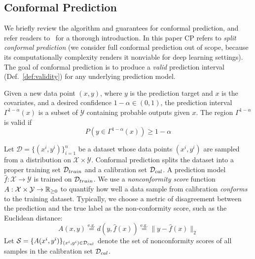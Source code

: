 

\subsection{Conformal Prediction}

We briefly review the algorithm and guarantees for conformal prediction, and refer readers to~\cite{angelopoulos2021gentle} for a thorough introduction. In this paper CP refers to \textit{split conformal prediction} (we consider full conformal prediction out of scope, because its computationally complexity renders it nonviable for deep learning settings). The goal of conformal prediction is to produce a \textit{valid} prediction interval (Def.~\ref{def:validity}) for any underlying prediction model.
%
\begin{definition}[Validity]
Given a new data point $(x,y)$, where $y$ is the prediction target and $x$ is the covariates,  and a desired confidence $1-\alpha \in (0,1)$, the prediction interval $\Gamma^{1-\alpha}(x)$ is a subset of $\mathcal{Y}$ containing probable outputs given $x$. The region $\Gamma^{1-\alpha}$ is valid if
%
\begin{equation}\label{eq:coverage}
P (y \in \Gamma^{1-\alpha}(x)) \geq 1-\alpha
 \end{equation}
\label{def:validity}
\end{definition}
%
\vspace{-2em}
Let $\mathcal{D} = \{ (x^i, y^i)\}_{i=1}^n$ be a dataset whose data points $(x^i, y^i)$ are sampled from a distribution on $ \mathcal{X} \times \mathcal{Y}$.  Conformal prediction splits the dataset into a proper training set $\mathcal{D}_{train}$ and a calibration set $\mathcal{D}_{cal}$. A prediction model $\hat{f}: \mathcal{X} \rightarrow  \mathcal{Y}$ is trained on $\mathcal{D}_{train}$. We use a \textit{nonconformity score} function $A: \mathcal{X} \times  \mathcal{Y} \rightarrow \mathbb{R}_{\geq 0}$ to quantify how well a data sample from calibration \textit{conforms} to the training dataset. Typically, we choose a metric of disagreement between the prediction and the true label as the non-conformity score, such as the Euclidean distance: 
%
\begin{equation}
 A(x,y) \stackrel{\text{e.g.}}{=} d(y,\hat{f}(x)) \stackrel{\text{e.g.}}{=} 
\|y - \hat{f}(x)\|_2 
\label{def:non-c}
\end{equation}
%
Let ${\mathcal{S}} = \{A(x^i, y^i)\}_{(x^i, y^i) \in \mathcal{D}_{cal}}$ denote the set of nonconformity scores of all samples in the calibration set $\mathcal{D}_{cal}$. %
